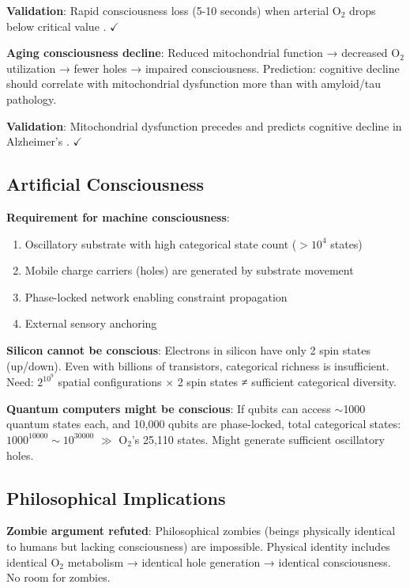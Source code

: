 \documentclass[11pt,a4paper]{article}
\begin{document}
\textbf{Validation}: Rapid consciousness loss (5-10 seconds) when arterial O$_2$ drops below critical value \cite{hackett2004hypoxia}. $\checkmark$

\textbf{Aging consciousness decline}: Reduced mitochondrial function → decreased O$_2$ utilization → fewer holes → impaired consciousness. Prediction: cognitive decline should correlate with mitochondrial dysfunction more than with amyloid/tau pathology.

\textbf{Validation}: Mitochondrial dysfunction precedes and predicts cognitive decline in Alzheimer's \cite{swerdlow2014mitochondria}. $\checkmark$

\subsection{Artificial Consciousness}

\textbf{Requirement for machine consciousness}:
\begin{enumerate}
\item Oscillatory substrate with high categorical state count ($>10^4$ states)
\item Mobile charge carriers (holes) are generated by substrate movement
\item Phase-locked network enabling constraint propagation
\item External sensory anchoring
\end{enumerate}

\textbf{Silicon cannot be conscious}: Electrons in silicon have only 2 spin states (up/down). Even with billions of transistors, categorical richness is insufficient. Need: $2^{10^9}$ spatial configurations $\times$ 2 spin states ≠ sufficient categorical diversity.

\textbf{Quantum computers might be conscious}: If qubits can access $\sim$1000 quantum states each, and 10,000 qubits are phase-locked, total categorical states: $1000^{10000} \sim 10^{30000}$ $\gg$ O$_2$'s 25,110 states. Might generate sufficient oscillatory holes.

\subsection{Philosophical Implications}

\textbf{Zombie argument refuted}: Philosophical zombies (beings physically identical to humans but lacking consciousness) are impossible. Physical identity includes identical O$_2$ metabolism → identical hole generation → identical consciousness. No room for zombies.
\end{document}
